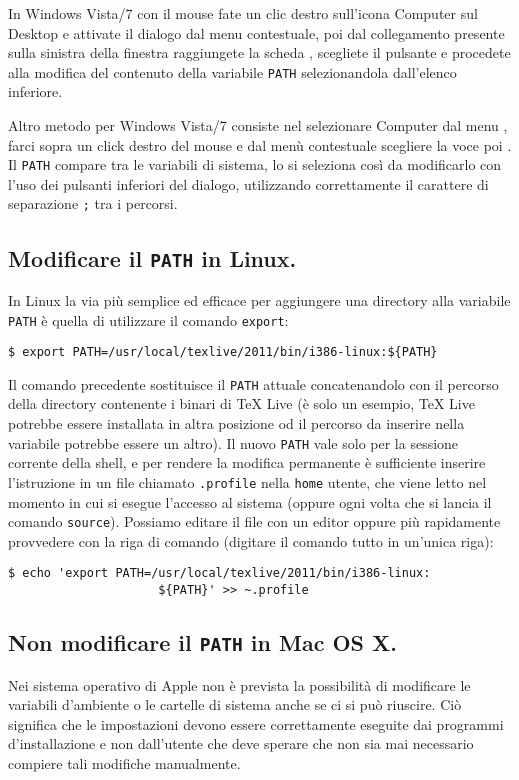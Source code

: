 In Windows Vista/7 con il mouse fate un clic destro sull'icona Computer sul Desktop e attivate il dialogo  dal menu contestuale, poi dal collegamento presente sulla sinistra della finestra  raggiungete la scheda , scegliete il pulsante  e procedete alla modifica del contenuto della variabile \texttt{PATH} selezionandola dall'elenco inferiore.

Altro metodo per Windows Vista/7 consiste nel selezionare Computer dal menu , farci sopra un click destro del mouse e dal menù contestuale scegliere la voce  poi . Il \texttt{PATH} compare tra le variabili di sistema, lo si seleziona così da modificarlo con l'uso dei pulsanti inferiori del dialogo, utilizzando correttamente il carattere di separazione \texttt{;} tra i percorsi.

\subsection{Modificare il \texttt{PATH} in Linux.}

In Linux la via più semplice ed efficace per aggiungere una directory alla variabile \texttt{PATH} è quella di utilizzare il comando \texttt{export}:
\begin{verbatim}
$ export PATH=/usr/local/texlive/2011/bin/i386-linux:${PATH}
\end{verbatim}

Il comando precedente sostituisce il \texttt{PATH} attuale concatenandolo con il percorso della directory contenente i binari di \TeX{} Live (è solo un esempio, \TeX{} Live potrebbe essere installata in altra posizione od il percorso da inserire nella variabile potrebbe essere un altro). Il nuovo \texttt{PATH} vale solo per la sessione corrente della shell, e per rendere la modifica permanente è sufficiente inserire l'istruzione in un file chiamato \texttt{.profile} nella \texttt{home} utente, che viene letto nel momento in cui si esegue l'accesso al sistema (oppure ogni volta che si lancia il comando \texttt{source}). Possiamo editare il file con un editor oppure più rapidamente provvedere con la riga di comando (digitare il comando tutto in un'unica riga):
\begin{verbatim}
$ echo 'export PATH=/usr/local/texlive/2011/bin/i386-linux:
                     ${PATH}' >> ~.profile
\end{verbatim}


\subsection{Non modificare il \texttt{PATH} in Mac OS X.}

Nei sistema operativo di Apple non è prevista la possibilità di modificare le variabili d'ambiente o le cartelle di sistema anche se ci si può riuscire. Ciò significa che le impostazioni devono essere correttamente eseguite dai programmi d'installazione e non dall'utente che deve sperare che non sia mai necessario compiere tali modifiche manualmente.




